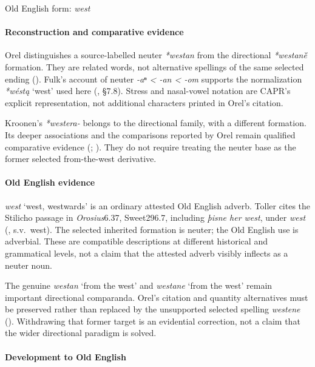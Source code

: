 \documentclass[
  british,
  a4paper,
]{article}
\providecommand{\Recon}[1]{\emph{*#1}}
\begin{document}
Old English form: \emph{west}

\paragraph{Reconstruction and comparative
evidence}\label{reconstruction-and-comparative-evidence-76}

Orel distinguishes a source-labelled neuter \emph{*westan} from the
directional \emph{*westanē̆} formation. They are related words, not
alternative spellings of the same selected ending
(). Fulk's account of neuter
\emph{-aⁿ < -an < -om} supports the normalization \Recon{wéstą} `west'
used here (, §7.8). Stress and
nasal-vowel notation are CAPR's explicit representation, not additional
characters printed in Orel's citation.

Kroonen's \emph{*westera-} belongs to the directional family, with a
different formation. Its deeper associations and the comparisons
reported by Orel remain qualified comparative evidence
(;
). They do not require treating
the neuter base as the former selected from-the-west derivative.

\paragraph{Old English evidence}\label{old-english-evidence-78}

{\emph{west}} `west, westwards' is an ordinary attested Old English
adverb. Toller cites the Stilicho passage in \emph{Orosius}6.37,
Sweet296.7, including \emph{þisne her west}, under \emph{west}
(, s.v.~west). The selected
inherited formation is neuter; the Old English use is adverbial. These
are compatible descriptions at different historical and grammatical
levels, not a claim that the attested adverb visibly inflects as a
neuter noun.

The genuine {\emph{westan}} `from the west' and {\emph{westane}} `from
the west' remain important directional comparanda. Orel's citation and
quantity alternatives must be preserved rather than replaced by the
unsupported selected spelling \emph{westene}
(). Withdrawing that former
target is an evidential correction, not a claim that the wider
directional paradigm is solved.

\paragraph{Development to Old
English}\label{development-to-old-english-77}
\end{document}
